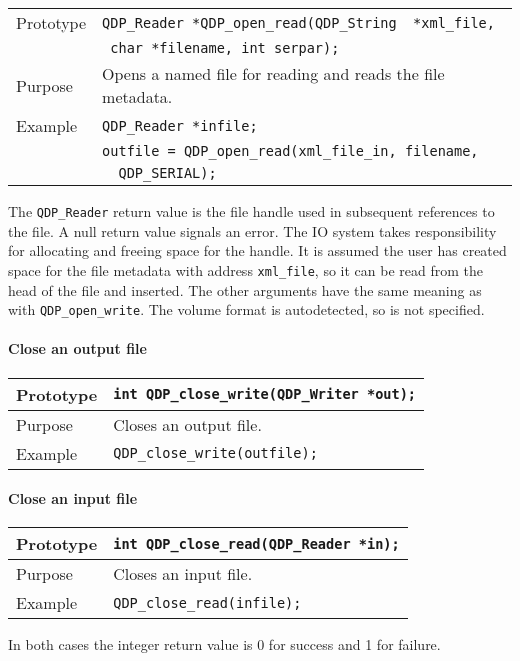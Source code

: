 \documentclass{article}
\newcommand{\QMDhandle}{{\tt QDP\_String }}
\begin{document}
\begin{flushleft}
  \begin{tabular}{|l|l|}
  \hline
  Prototype      & \verb|QDP_Reader *QDP_open_read(|\QMDhandle \verb| *xml_file,|\\
                 & \verb| char *filename, int serpar);|\\
    \hline
  Purpose        & Opens a named file for reading and reads the file metadata. \\
\hline
  Example  & \verb|QDP_Reader *infile;| \\
           & \verb|outfile = QDP_open_read(xml_file_in, filename, |\\
	   & \verb|  QDP_SERIAL);| \\
   \hline
 \end{tabular}
\end{flushleft}
%
The \verb|QDP_Reader| return value is the file handle used in
subsequent references to the file.  A null return value signals an
error. The IO system takes responsibility for allocating and freeing
space for the handle.  It is assumed the user has created space for
the file metadata with address \verb|xml_file|, so it can be read from
the head of the file and inserted.  The other arguments have the same
meaning as with \verb|QDP_open_write|.  The volume format is
autodetected, so is not specified.
%
\paragraph{Close an output file}

\begin{flushleft}
  \begin{tabular}{|l|l|}
  \hline
  Prototype      & \verb|int QDP_close_write(QDP_Writer *out);| \\
    \hline
  Purpose        & Closes an output file. \\
\hline
  Example        & \verb|QDP_close_write(outfile);|\\
   \hline
 \end{tabular}
\end{flushleft}
%
\paragraph{Close an input file}

\begin{flushleft}
  \begin{tabular}{|l|l|}
  \hline
  Prototype      & \verb|int QDP_close_read(QDP_Reader *in);| \\
    \hline
  Purpose        & Closes an input file. \\
\hline
  Example        & \verb|QDP_close_read(infile);|\\
   \hline
 \end{tabular}
\end{flushleft}
%
In both cases the integer return value is 0 for success and 1 for failure.
\end{document}

